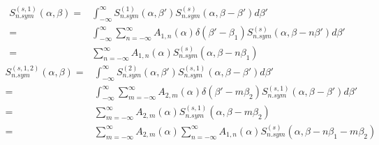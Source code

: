 \documentclass[../master.tex]{subfiles}
\begin{document}
                                \begin{align}
                                  S^{(s,1)}_{n.sym}(\alpha,\beta)=&\int_{-\infty}^{\infty}S^{(1)}_{n.sym}\left(\alpha,\beta'\right)S^{(s)}_{n.sym}\left(\alpha,\beta-\beta'\right)d\beta'\\
                                  =&\int_{-\infty}^{\infty}\sum_{n=-\infty}^{\infty}A_{1,n}(\alpha)\delta\left(\beta'-\beta_1\right)S^{(s)}_{n.sym}\left(\alpha,\beta-n\beta'\right)d\beta'\\
                                  =&\sum_{n=-\infty}^{\infty}A_{1,n}(\alpha)S^{(s)}_{n.sym}\left(\alpha,\beta-n\beta_1\right)
                                \end{align}
                                \begin{align}
                                  S^{(s,1,2)}_{n.sym}(\alpha,\beta)=&\int_{-\infty}^{\infty}S^{(2)}_{n.sym}\left(\alpha,\beta'\right)S^{(s,1)}_{n.sym}\left(\alpha,\beta-\beta'\right)d\beta'\\
                                  =&\int_{-\infty}^{\infty}\sum_{m=-\infty}^{\infty}A_{2,m}(\alpha)\delta\left(\beta'-m\beta_2\right)S^{(s,1)}_{n.sym}\left(\alpha,\beta-\beta'\right)d\beta'\\
                                  =&\sum_{m=-\infty}^{\infty}A_{2,m}(\alpha)S^{(s,1)}_{n.sym}\left(\alpha,\beta-m\beta_2\right)\\
                                  =&\sum_{m=-\infty}^{\infty}A_{2,m}(\alpha)\sum_{n=-\infty}^{\infty}A_{1,n}(\alpha)S^{(s)}_{n.sym}\left(\alpha,\beta-n\beta_1-m\beta_2\right)
\\
                                \end{align}





			
\end{document}
